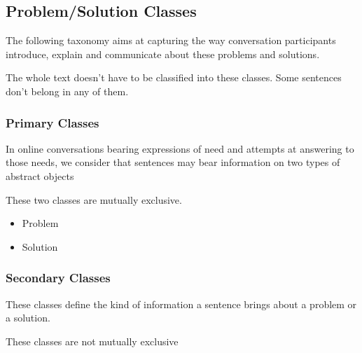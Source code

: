 \subsection{Problem/Solution Classes}

The following taxonomy aims at capturing the way conversation participants introduce, explain and communicate about these problems and solutions.

The whole text doesn't have to be classified into these classes. Some sentences don't belong in any of them. 

\subsubsection{Primary Classes}

In online conversations bearing expressions of need and attempts at answering to those needs, we consider that sentences may bear information on two types of abstract objects

These two classes are mutually exclusive.

\begin{itemize}
	\item Problem
	\item Solution
\end{itemize}

\subsubsection{Secondary Classes}

These classes define the kind of information a sentence brings about a problem or a solution.

These classes are not mutually exclusive

